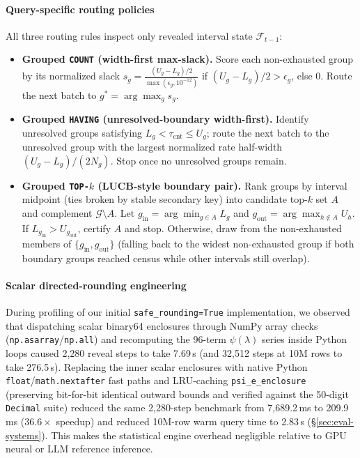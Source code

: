 \paragraph{Query-specific routing policies}
All three routing rules inspect only revealed interval state $\mathcal{F}_{t-1}$:
\begin{itemize}
  \item \textbf{Grouped \texttt{COUNT} (width-first max-slack).} Score each non-exhausted group by its normalized slack $s_g = \frac{(U_g - L_g)/2}{\max(\epsilon_g, 10^{-12})}$ if $(U_g - L_g)/2 > \epsilon_g$, else $0$. Route the next batch to $g^* = \arg\max_g s_g$.
  \item \textbf{Grouped \texttt{HAVING} (unresolved-boundary width-first).} Identify unresolved groups satisfying $L_g < \tau_{\text{cnt}} \le U_g$; route the next batch to the unresolved group with the largest normalized rate half-width $(U_g - L_g)/(2 N_g)$. Stop once no unresolved groups remain.
  \item \textbf{Grouped \texttt{TOP-$k$} (LUCB-style boundary pair).} Rank groups by interval midpoint (ties broken by stable secondary key) into candidate top-$k$ set $A$ and complement $\mathcal{G} \setminus A$. Let $g_{\text{in}} = \arg\min_{g \in A} L_g$ and $g_{\text{out}} = \arg\max_{h \notin A} U_h$. If $L_{g_{\text{in}}} > U_{g_{\text{out}}}$, certify $A$ and stop. Otherwise, draw from the non-exhausted members of $\{g_{\text{in}}, g_{\text{out}}\}$ (falling back to the widest non-exhausted group if both boundary groups reached census while other intervals still overlap).
\end{itemize}

\paragraph{Scalar directed-rounding engineering}
During profiling of our initial \texttt{safe\_rounding=True} implementation, we observed that dispatching scalar binary64 enclosures through NumPy array checks (\texttt{np.asarray}/\texttt{np.all}) and recomputing the 96-term $\psi(\lambda)$ series inside Python loops caused 2,280 reveal steps to take 7.69\,s (and 32,512 steps at 10M rows to take 276.5\,s).
Replacing the inner scalar enclosures with native Python \texttt{float}/\texttt{math.nextafter} fast paths and LRU-caching \texttt{psi\_e\_enclosure} (preserving bit-for-bit identical outward bounds and verified against the 50-digit \texttt{Decimal} suite) reduced the same 2,280-step benchmark from 7,689.2\,ms to 209.9\,ms ($36.6\times$ speedup) and reduced 10M-row warm query time to 2.83\,s (\S\ref{sec:eval-systems}).
This makes the statistical engine overhead negligible relative to GPU neural or LLM reference inference.

